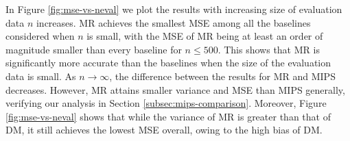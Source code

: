 In Figure \ref{fig:mse-vs-neval} we plot the results with increasing size of evaluation data $n$ increases. MR achieves the smallest MSE among all the baselines considered when $n$ is small, with the MSE of MR being at least an order of magnitude smaller than every baseline for $n\leq 500$. This shows that MR is significantly more accurate than the baselines when the size of the evaluation data is small. As $n\rightarrow \infty$, the difference between the results for MR and MIPS decreases. However, MR attains smaller variance and MSE than MIPS generally, verifying our analysis in Section \ref{subsec:mips-comparison}.
Moreover, Figure \ref{fig:mse-vs-neval} shows that while the variance of MR is greater than that of DM, it still achieves the lowest MSE overall, owing to the high bias of DM.

